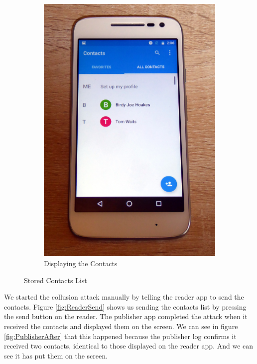\begin{figure}[h!]
\begin{subfigure}{0.49\textwidth}
        \includegraphics[height=0.45\textheight]{graphics/PhonePhotos/03 - DisplayContacts.jpg}
        \caption{Displaying the Contacts}
        \label{fig:DisplayingContacts}
	\end{subfigure}
	\caption{Stored Contacts List}
	\label{fig:ContactsList}
\end{figure}

We started the collusion attack manually by telling the reader app to send the contacts.  Figure \ref{fig:ReaderSend} shows us sending the contacts list by pressing the send button on the reader.  The publisher app completed the attack when it received the contacts and displayed them on the screen.  We can see in figure \ref{fig:PublisherAfter} that this happened because the publisher log confirms it received two contacts, identical to those displayed on the reader app.  And we can see it has put them on the screen.

